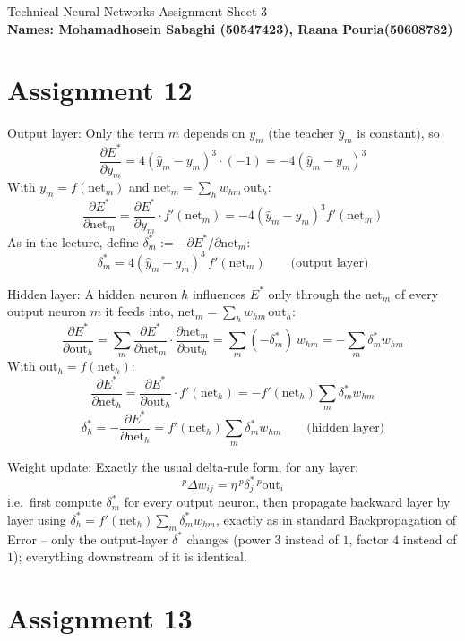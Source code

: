 \documentclass[11pt,a4paper]{article}
\begin{document}
\begin{center}
{\large Technical Neural Networks Assignment Sheet 3}\\[4pt]
{\bfseries Names: Mohamadhosein Sabaghi (50547423), Raana Pouria(50608782)}
\end{center}

\section*{Assignment 12}

Output layer: Only the term $m$ depends on $y_m$ (the teacher $\hat y_m$ is constant), so
\[
  \frac{\partial E^*}{\partial y_m} = 4(\hat y_m-y_m)^3\cdot(-1) = -4(\hat y_m-y_m)^3
\]
With $y_m=f(\mathrm{net}_m)$ and $\mathrm{net}_m=\sum_h w_{hm}\,\mathrm{out}_h$:
\[
  \frac{\partial E^*}{\partial \mathrm{net}_m} = \frac{\partial E^*}{\partial y_m}\cdot f'(\mathrm{net}_m) = -4(\hat y_m-y_m)^3 f'(\mathrm{net}_m)
\]
As in the lecture, define $\delta_m^*:=-\partial E^*/\partial \mathrm{net}_m$:
\[
  \boxed{\delta_m^* = 4(\hat y_m-y_m)^3\, f'(\mathrm{net}_m)} \qquad \text{(output layer)}
\]

Hidden layer: A hidden neuron $h$ influences $E^*$ only through the $\mathrm{net}_m$ of every
output neuron $m$ it feeds into, $\mathrm{net}_m = \sum_h w_{hm}\,\mathrm{out}_h$:
\[
  \frac{\partial E^*}{\partial \mathrm{out}_h} = \sum_m \frac{\partial E^*}{\partial \mathrm{net}_m}\cdot\frac{\partial \mathrm{net}_m}{\partial \mathrm{out}_h}
  = \sum_m(-\delta_m^*)\,w_{hm} = -\sum_m \delta_m^* w_{hm}
\]
With $\mathrm{out}_h = f(\mathrm{net}_h)$:
\[
  \frac{\partial E^*}{\partial \mathrm{net}_h} = \frac{\partial E^*}{\partial \mathrm{out}_h}\cdot f'(\mathrm{net}_h) = -f'(\mathrm{net}_h)\sum_m \delta_m^* w_{hm}
\]
\[
  \boxed{\delta_h^* = -\frac{\partial E^*}{\partial \mathrm{net}_h} = f'(\mathrm{net}_h)\sum_m \delta_m^* w_{hm}} \qquad \text{(hidden layer)}
\]

Weight update: Exactly the usual delta-rule form, for any layer:
\[
  {}^p\Delta w_{ij} = \eta\,{}^p\delta_j^*\,{}^p\mathrm{out}_i
\]
i.e.\ first compute $\delta_m^*$ for every output neuron, then propagate backward layer by layer using
$\delta_h^* = f'(\mathrm{net}_h)\sum_m \delta_m^* w_{hm}$, exactly as in standard Backpropagation of Error --
only the output-layer $\delta^*$ changes (power $3$ instead of $1$, factor $4$ instead of $1$); everything
downstream of it is identical.

\section*{Assignment 13}
\end{document}
